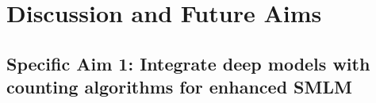 \documentclass{ucetd}
\begin{document}

\section{Discussion and Future Aims}

\subsection{Specific Aim 1: Integrate deep models with counting algorithms for enhanced SMLM}
\end{document}
